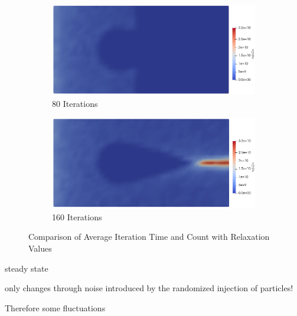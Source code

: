\begin{figure}[H]
    \centering
    \begin{subfigure}[b]{0.49\linewidth}
        \centering
        \includegraphics[width=\linewidth]{figures/Sphere/80_iterations.png}
        \caption{80 Iterations}
        \label{fig:average_iteration_time}
    \end{subfigure}
    \hfill
    \begin{subfigure}[b]{0.49\linewidth}
        \centering
        \includegraphics[width=\linewidth]{figures/Sphere/160_iterations.png}
        \caption{160 Iterations}
        \label{fig:average_iteration_count}
    \end{subfigure}
    \caption{Comparison of Average Iteration Time and Count with Relaxation Values}
    \label{fig:comparison}
\end{figure}


steady state 

only changes through noise introduced by the randomized injection of particles!

Therefore some fluctuations


